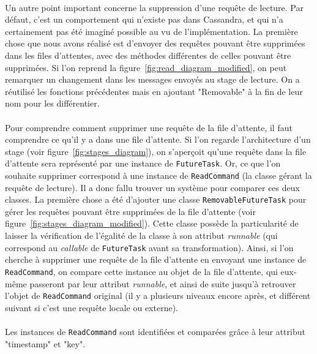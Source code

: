 \documentclass[12pt]{article}
\newcommand{\class}[1]{\texttt{#1}}
\begin{document}
\paragraph{}Un autre point important concerne la suppression d'une requête de lecture. Par défaut, c'est un comportement qui n'existe pas dans Cassandra, et qui n'a certainement pas été imaginé possible au vu de l'implémentation. La première chose que nous avons réalisé est d'envoyer des requêtes pouvant être supprimées dans les files d'attentes, avec des méthodes différentes de celles pouvant être supprimées. Si l'on reprend la figure~\ref{fig:read_diagram_modified}, on peut remarquer un changement dans les messages envoyés au stage de lecture. On a réutilisé les fonctions précédentes mais en ajoutant "Removable" à la fin de leur nom pour les différentier.

\paragraph{}Pour comprendre comment supprimer une requête de la file d'attente, il faut comprendre ce qu'il y a dans une file d'attente. Si l'on regarde l'architecture d'un stage (voir figure~\ref{fig:stages_diagram}), on s'aperçoit qu'une requête dans la file d'attente sera représenté par une instance de \class{FutureTask}. Or, ce que l'on souhaite supprimer correspond à une instance de \class{ReadCommand} (la classe gérant la requête de lecture). Il a donc fallu trouver un système pour comparer ces deux classes. La première chose a été d'ajouter une classe \class{RemovableFutureTask} pour gérer les requêtes pouvant être supprimées de la file d'attente (voir figure~\ref{fig:stages_diagram_modified}). Cette classe possède la particularité de laisser la vérification de l'égalité de la classe à son attribut \textit{runnable} (qui correspond au \textit{callable} de \class{FutureTask} avant sa transformation). Ainsi, si l'on cherche à supprimer une requête de la file d'attente en envoyant une instance de \class{ReadCommand}, on compare cette instance au objet de la file d'attente, qui eux-même passeront par leur attribut \textit{runnable}, et ainsi de suite jusqu'à retrouver l'objet de \class{ReadCommand} original (il y a plusieurs niveaux encore après, et différent suivant si c'est une requête locale ou externe).

\paragraph{}Les instances de \class{ReadCommand} sont identifiées et comparées grâce à leur attribut "timestamp" et "key".
\end{document}
